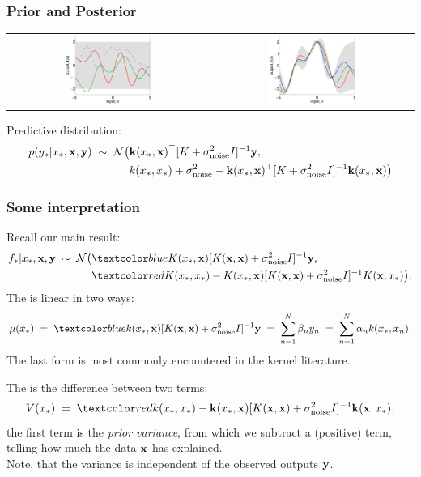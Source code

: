 \begin{frame}
\frametitle{Prior and Posterior}

\begin{center}
\begin{tabular}{cc}
\includegraphics[width=0.45\textwidth]{priorpost} &
{\includegraphics[width=0.45\textwidth]{priorpost1}}
\end{tabular}
\end{center}

Predictive distribution:
\[
\begin{split}
p(y_*|x_*,{\bf x},{\bf y})\;\sim\;{\cal N}\big(&{\bf k}(x_*,{\bf x})^\top
[K+\sigma_{\rm noise}^2I]^{-1}{ \bf y},\\
&k(x_*,x_*)+\sigma_{\rm noise}^2 - {\bf k}(x_*,{\bf x})^\top 
[K+\sigma_{\rm noise}^2I]^{-1}{\bf k}(x_*,{\bf x})\big)
\end{split}
\]
\end{frame}

\begin{frame}
\frametitle{Some interpretation}

Recall our main result:
\[
\begin{split}
f_*|x_*,\bfx,{\bf y}\;\sim\; {\cal N}\big(&\Blue{K(x_*,\bfx)
[K(\bfx,\bfx)+\sigma_\mathrm{noise}^2I]^{-1}{\bf y},}\\
&\Red{K(x_*,x_*)-K(x_*,\bfx)[K(\bfx,\bfx)+\sigma_\mathrm{noise}^2I]^{-1}K(\bfx,x_*)}\big).
\end{split}
\]
The  is linear in two ways:
\[
\mu(x_*)\;=\;\Blue{k(x_*,\bfx)[K(\bfx,\bfx)+\sigma_\mathrm{noise}^2I]^{-1}{\bf y}}
\;=\;\sum_{n=1}^N\beta_n y_n\;=\;
\sum_{n=1}^N\alpha_nk(x_*,x_n).
\]
The last form is most commonly encountered in the kernel literature.

The  is the difference between two terms:
\[
V(x_*)\;=\;\Red{k(x_*,x_*)-{\bf k}(x_*,\bfx)
[K(\bfx,\bfx)+\sigma_\mathrm{noise}^2I]^{-1}{\bf k}(\bfx,x_*)},
\]
the first term is the \emph{prior variance}, from which we subtract
a (positive) term, telling how much the data $\mathbf x$ has
explained.\\
Note, that the variance is independent of the observed
outputs ${\bf y}$.
\end{frame}



